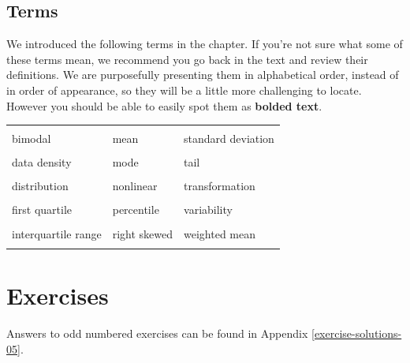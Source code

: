 \documentclass[
  10pt,
  openany]{book}
\begin{document}
\hypertarget{terms-3}{%
\subsection{Terms}\label{terms-3}}

We introduced the following terms in the chapter.
If you're not sure what some of these terms mean, we recommend you go back in the text and review their definitions.
We are purposefully presenting them in alphabetical order, instead of in order of appearance, so they will be a little more challenging to locate.
However you should be able to easily spot them as \textbf{bolded text}.

\begin{tabu} to 
\toprule
{} &  & \\
bimodal & mean & standard deviation\\
 &  & \\
data density & mode & tail\\
 &  & \\
distribution & nonlinear & transformation\\
 &  & \\
first quartile & percentile & variability\\
 &  & \\
interquartile range & right skewed & weighted mean\\
 &  & \\
\bottomrule
\end{tabu}

\clearpage

\hypertarget{chp5-exercises}{%
\section{Exercises}\label{chp5-exercises}}

Answers to odd numbered exercises can be found in Appendix \ref{exercise-solutions-05}.
\end{document}
